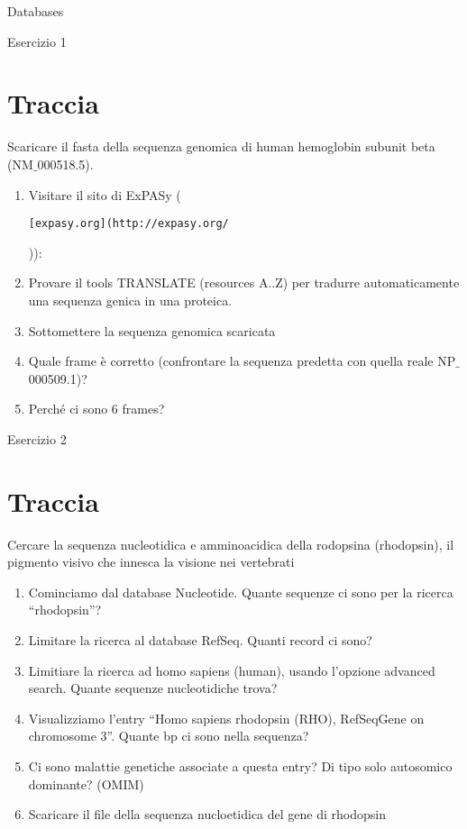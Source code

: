 \documentclass{article}
\begin{document}
\begin{center}
   \Huge
   Databases
\end{center}
\begin{center}
   \huge
   Esercizio 1
\end{center}
\section*{Traccia}
Scaricare il fasta della sequenza genomica di human hemoglobin subunit beta (NM$\_$000518.5).
\begin{enumerate}
   \item Visitare il sito di ExPASy (\begin{verbatim}[expasy.org](http://expasy.org/\end{verbatim})):
   \item Provare il tools TRANSLATE (resources A..Z) per tradurre automaticamente una sequenza genica in una proteica.
   \item Sottomettere la sequenza genomica scaricata
   \item Quale frame è corretto (confrontare la sequenza predetta con quella reale NP$\_$000509.1)?
   \item Perché ci sono 6 frames?
\end{enumerate}


\begin{center}
   \huge
   Esercizio 2
\end{center}
\section*{Traccia}
Cercare la sequenza nucleotidica e amminoacidica della rodopsina (rhodopsin), il pigmento visivo che innesca la visione nei vertebrati
\begin{enumerate}
   \item Cominciamo dal database Nucleotide. Quante sequenze ci sono per la ricerca “rhodopsin”?
   \item Limitare la ricerca al database RefSeq. Quanti record ci sono?
   \item Limitiare la ricerca ad homo sapiens (human), usando l’opzione advanced search. Quante sequenze nucleotidiche trova?
   \item Visualizziamo l’entry “Homo sapiens rhodopsin (RHO), RefSeqGene on chromosome 3”. Quante bp ci sono nella sequenza?
   \item Ci sono malattie genetiche associate a questa entry? Di tipo solo autosomico dominante? (OMIM)
   \item Scaricare il file della sequenza nucloetidica del gene di rhodopsin
\end{enumerate}
\end{document}
